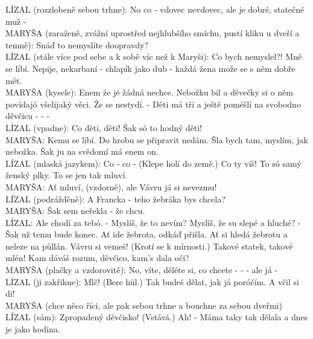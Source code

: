 \documentclass[11pt]{article}
\begin{document}
    LÍZAL (rozzlobeně sebou trhne): No co - vdovec nevdovec, ale je dobré, statečné muž -\\
    MARYŠA (zaraženě, zvážní uprostřed nejhlubšího smíchu, pustí kliku u dveří a temně): Snáď to nemyslíte doopravdy?\\
    LÍZAL (stále více pod sebe a k sobě víc než k Maryši): Co bych nemyslel?! Mně se líbí. Nepije, nekarbaní - chlapík jako dub - každá žena može se s něm dobře mět.\\
    MARYŠA (kysele): Enem že jé žádná nechce. Nebožku bil a děvečky si o něm povídajó všelijaký věci. Že se nestydí. - Děti má tři a ještě poméšlí na svobodno děvčicu - - -\\
    LÍZAL (vpadne): Co děti, děti! Šak só to hodný děti!\\
    MARYŠA: Kemu se líbí. Do hrobu se připravit nedám. Šla bych tam, myslím, jak nebožka. Šak ju na svědomí má enem on.\\
    LÍZAL (mlaská jazykem): Co - co - (Klepe holí do země.) Co ty víš! To só samý ženský plky. To se jen tak mluví.\\
    MARYŠA: Ať mluví, (vzdorně), ale Vávru já si nevezmu!\\
    LÍZAL (podrážděně): A Francka - teho žebráka bys chcela?\\
    MARYŠA: Šak sem neřekla - že chcu.\\
    LÍZAL: Ale chodí za tebó. - Myslíš, že to nevím? Myslíš, že su slepé a hluché? - Šak už temu bude konec. Ať ide žebrota, odkáď přišla. Ať si hledá žebrotu a neleze na půllán. Vávru si vemeš! (Krotí se k mírnosti.) Takové statek, takové mlén! Kam dáváš rozum, děvčico, kam's dala oči?\\
    MARYŠA (plačky a vzdorovitě): No, víte, děléte si, co chcete - - - ale já -\\
    LÍZAL (ji zakřikne): Mlč! (Bere hůl.) Tak budeš dělat, jak já poróčím. A včil si di!\\
    MARYŠA (chce něco říci, ale pak sebou trhne a bouchne za sebou dveřmi)\\
    LÍZAL (sám): Zpropadený děvčisko! (Vstává.) Ah! - Máma taky tak dělala a dnes je jako hodina.
    \newpage
\end{document}
